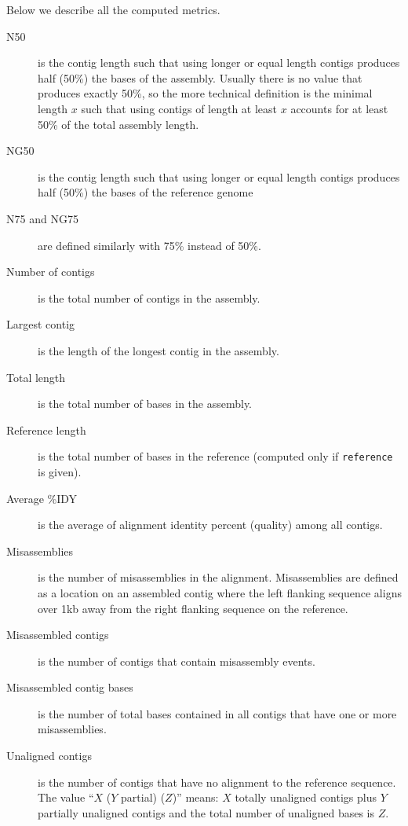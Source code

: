 \documentclass{article}
\begin{document}
Below we describe all the computed metrics.

\begin{description}
\item[N50] is the contig length such that using longer or equal length contigs
produces half (50\%) the bases of the assembly.  Usually there is no
value that produces exactly 50\%, so the more technical definition is
the minimal length $x$ such that using contigs of length at least $x$ accounts for at least 50\% of the total assembly length.

\item[NG50] is the contig length such that using longer or equal length contigs
produces half (50\%) the bases of the reference genome

\item[N75 and NG75] are defined similarly with 75\% instead of 50\%.

\item[Number of contigs] is the total number of contigs in the assembly.

\item[Largest contig] is the length of the longest contig in the assembly.

\item[Total length] is the total number of bases in the assembly.

\item[Reference length] is the total number of bases in the reference
(computed only if {\tt reference} is given).

\item[Average \%IDY] is the average of alignment identity percent (quality) among all contigs.

\item[Misassemblies] is the number of misassemblies in the alignment.
Misassemblies are defined as a location on an assembled contig where the left
flanking sequence aligns over 1kb away from the right flanking sequence on the
reference.

\item[Misassembled contigs] is the number of contigs that contain misassembly
events.

\item[Misassembled contig bases] is the number of total bases contained in all
contigs that have one or more misassemblies.

\item[Unaligned contigs] is the number of contigs that have no alignment to the
reference sequence.  The value ``$X$ ($Y$ partial) ($Z$)'' means:
$X$ totally unaligned contigs
plus $Y$ partially unaligned contigs
and the total number of unaligned bases is $Z$.


\end{description}
\end{document}
